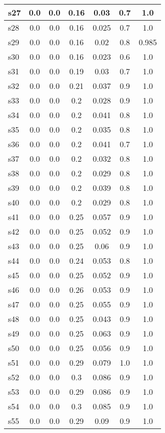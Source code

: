\documentclass{article}
\begin{document}
\begin{tabular}{|l|c|c|c|c|c|c|}
\hline
s27 &0.0 & 0.0 & 0.16 & 0.03 & 0.7 & 1.0\\
\hline
s28 &0.0 & 0.0 & 0.16 & 0.025 & 0.7 & 1.0\\
\hline
s29 &0.0 & 0.0 & 0.16 & 0.02 & 0.8 & 0.985\\
\hline
s30 &0.0 & 0.0 & 0.16 & 0.023 & 0.6 & 1.0\\
\hline
s31 &0.0 & 0.0 & 0.19 & 0.03 & 0.7 & 1.0\\
\hline
s32 &0.0 & 0.0 & 0.21 & 0.037 & 0.9 & 1.0\\
\hline
s33 &0.0 & 0.0 & 0.2 & 0.028 & 0.9 & 1.0\\
\hline
s34 &0.0 & 0.0 & 0.2 & 0.041 & 0.8 & 1.0\\
\hline
s35 &0.0 & 0.0 & 0.2 & 0.035 & 0.8 & 1.0\\
\hline
s36 &0.0 & 0.0 & 0.2 & 0.041 & 0.7 & 1.0\\
\hline
s37 &0.0 & 0.0 & 0.2 & 0.032 & 0.8 & 1.0\\
\hline
s38 &0.0 & 0.0 & 0.2 & 0.029 & 0.8 & 1.0\\
\hline
s39 &0.0 & 0.0 & 0.2 & 0.039 & 0.8 & 1.0\\
\hline
s40 &0.0 & 0.0 & 0.2 & 0.029 & 0.8 & 1.0\\
\hline
s41 &0.0 & 0.0 & 0.25 & 0.057 & 0.9 & 1.0\\
\hline
s42 &0.0 & 0.0 & 0.25 & 0.052 & 0.9 & 1.0\\
\hline
s43 &0.0 & 0.0 & 0.25 & 0.06 & 0.9 & 1.0\\
\hline
s44 &0.0 & 0.0 & 0.24 & 0.053 & 0.8 & 1.0\\
\hline
s45 &0.0 & 0.0 & 0.25 & 0.052 & 0.9 & 1.0\\
\hline
s46 &0.0 & 0.0 & 0.26 & 0.053 & 0.9 & 1.0\\
\hline
s47 &0.0 & 0.0 & 0.25 & 0.055 & 0.9 & 1.0\\
\hline
s48 &0.0 & 0.0 & 0.25 & 0.043 & 0.9 & 1.0\\
\hline
s49 &0.0 & 0.0 & 0.25 & 0.063 & 0.9 & 1.0\\
\hline
s50 &0.0 & 0.0 & 0.25 & 0.056 & 0.9 & 1.0\\
\hline
s51 &0.0 & 0.0 & 0.29 & 0.079 & 1.0 & 1.0\\
\hline
s52 &0.0 & 0.0 & 0.3 & 0.086 & 0.9 & 1.0\\
\hline
s53 &0.0 & 0.0 & 0.29 & 0.086 & 0.9 & 1.0\\
\hline
s54 &0.0 & 0.0 & 0.3 & 0.085 & 0.9 & 1.0\\
\hline
s55 &0.0 & 0.0 & 0.29 & 0.09 & 0.9 & 1.0\\

\end{tabular}
\end{document}
